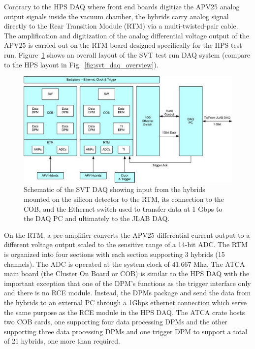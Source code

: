 Contrary to the HPS DAQ where front end boards digitize the APV25 analog output signals 
inside the vacuum chamber, the hybrids carry analog signal directly to the 
Rear Transition Module (RTM) via a multi-twisted-pair cable. The amplification and digitization of the 
analog differential voltage output of the APV25 is carried out on the RTM board 
designed specifically for the HPS test run. Figure~\ref{fig:svtdaq} shows an overall layout of 
the SVT test run DAQ system (compare to the HPS layout in Fig.~\ref{fig:svt_daq_overview}).
 \begin{figure}[t]
\includegraphics[scale=0.9]{test2012/daq/svt_daq_diagram.png}
\caption{\small{Schematic of the SVT DAQ showing input from the hybrids mounted on the silicon detector to the RTM, its connection to the COB, and the Ethernet switch used to transfer data at 1 Gbps to the 
DAQ PC and ultimately to the JLAB DAQ.}}
\label{fig:svtdaq}
\end{figure}
On the RTM, a pre-amplifier converts the APV25 differential current output to a different voltage output 
scaled to the sensitive range of a 14-bit ADC. The RTM is organized into four sections with each section 
supporting 3 hybrids (15 channels). 
The ADC is operated at the system clock of 41.667 Mhz. 
The ATCA main board (the Cluster On Board or COB) is similar to the HPS DAQ with the important exception that one of the DPM's functions as the trigger interface only and there is no RCE module. 
Instead, the DPMs package and send the data from the hybrids to an external PC through a 1Gbps 
ethernet connection which serve the same purpose as the RCE module in the HPS DAQ. 
The ATCA crate hosts two COB cards, one supporting four data processing DPMs and the other supporting three data processing DPMs and one trigger DPM to support a total of 21 hybrids, one more than required. 
